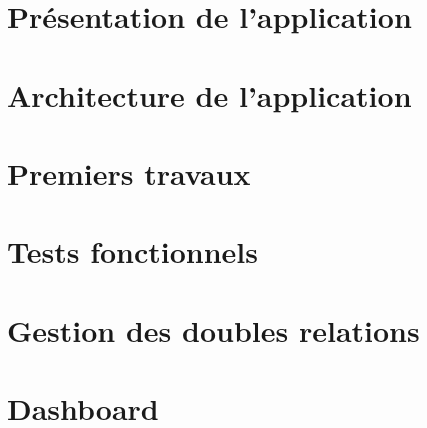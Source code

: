
\section{Présentation de l'application}
	
	
\section{Architecture de l'application}
	
	
\section{Premiers travaux}
	
	
\section{Tests fonctionnels}
	
	
\section{Gestion des doubles relations}
	
	
\section{Dashboard}
	